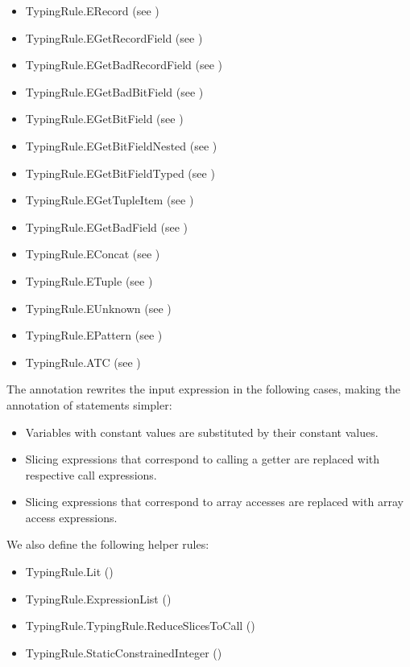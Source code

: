 \documentclass{book}
\begin{document}
\begin{itemize}
\item TypingRule.ERecord (see )
\item TypingRule.EGetRecordField (see )
\item TypingRule.EGetBadRecordField (see )
\item TypingRule.EGetBadBitField (see )
\item TypingRule.EGetBitField (see )
\item TypingRule.EGetBitFieldNested (see )
\item TypingRule.EGetBitFieldTyped (see )
\item TypingRule.EGetTupleItem (see )
\item TypingRule.EGetBadField (see )
\item TypingRule.EConcat (see )
\item TypingRule.ETuple (see )
\item TypingRule.EUnknown (see )
\item TypingRule.EPattern (see )
\item TypingRule.ATC (see )
\end{itemize}

The annotation rewrites the input expression in the following cases, making the annotation of statements simpler:
\begin{itemize}
  \item Variables with constant values are substituted by their constant values.
  \item Slicing expressions that correspond to calling a getter are replaced with respective call expressions.
  \item Slicing expressions that correspond to array accesses are replaced with array access expressions.
\end{itemize}

We also define the following helper rules:
\begin{itemize}
  \item TypingRule.Lit ()
  \item TypingRule.ExpressionList ()
  \item TypingRule.TypingRule.ReduceSlicesToCall ()
  \item TypingRule.StaticConstrainedInteger ()
\end{itemize}
\end{document}
